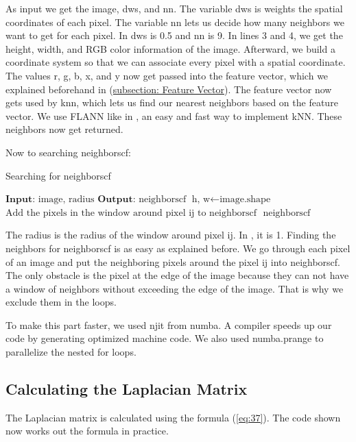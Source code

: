 As input we get the image, dws, and nn. The variable dws is weights the spatial coordinates of each pixel. The variable nn lets us decide how many neighbors we want to get for each pixel. In \cite{lnclm} dws is 0.5 and nn is 9.
In lines 3 and 4, we get the height, width, and RGB color information of the image. Afterward, we build a coordinate system so that we can associate every pixel with a spatial coordinate. The values r, g, b, x, and y now get passed into the feature vector, which we explained beforehand in (\hyperref[subsec:feat]{subsection: Feature Vector}).
The feature vector now gets used by knn, which lets us find our nearest neighbors based on the feature vector. We use FLANN like in \cite{lnclm}, an easy and fast way to implement kNN. These neighbors now get returned.


Now to searching neighborscf:
\begin{algorithm}[t]
	\caption{Searching for neighborscf}\label{neighborscf}
	\begin{algorithmic}[1]
		\State $\textbf{Input: }  \text{image, radius}$
		\State $\textbf{Output: }  \text{neighborscf}$
		\newline
		\State $\text{h, w} \gets \text{image.shape} $
		\newline
		\State $\text{Add the pixels in the window around pixel ij to neighborscf}$
		\EndFor
		\EndFor
		\newline
		\Return $\text{ neighborscf}$
	\end{algorithmic}
\end{algorithm}

The radius is the radius of the window around pixel ij. In \cite{lnclm}, it is 1.
Finding the neighbors for neighborscf is as easy as explained before. We go through each pixel of an image and put the neighboring pixels around the pixel ij into neighborscf. The only obstacle is the pixel at the edge of the image because they can not have a window of neighbors without exceeding the edge of the image. That is why we exclude them in the loops. 

To make this part faster, we used njit from numba. A compiler speeds up our code by generating optimized machine code. We also used numba.prange to parallelize the nested for loops. 

\subsection{Calculating the Laplacian Matrix}
\label{subsec:laplace}
The Laplacian matrix is calculated using the formula (\ref{eq:37}). The code shown now works out the formula in practice. 

